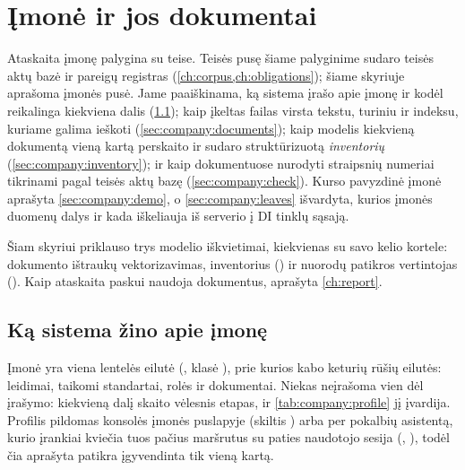 \chapter{Įmonė ir jos dokumentai}\label{ch:company}

Ataskaita įmonę palygina su teise. Teisės pusę šiame palyginime sudaro teisės aktų bazė ir
pareigų registras (\cref{ch:corpus,ch:obligations}); šiame skyriuje aprašoma įmonės pusė. Jame
paaiškinama, ką sistema įrašo apie įmonę ir kodėl reikalinga kiekviena dalis
(\cref{sec:company:profile}); kaip įkeltas failas virsta tekstu, turiniu ir indeksu, kuriame
galima ieškoti (\cref{sec:company:documents}); kaip modelis kiekvieną dokumentą vieną kartą
perskaito ir sudaro struktūrizuotą \emph{inventorių} (\cref{sec:company:inventory}); ir kaip
dokumentuose nurodyti straipsnių numeriai tikrinami pagal teisės aktų bazę
(\cref{sec:company:check}). Kurso pavyzdinė įmonė \demo{} aprašyta \cref{sec:company:demo}, o
\cref{sec:company:leaves} išvardyta, kurios įmonės duomenų dalys ir kada iškeliauja iš serverio
į DI tinklų sąsają.

Šiam skyriui priklauso trys modelio iškvietimai, kiekvienas su savo kelio kortele: dokumento
ištraukų vektorizavimas, inventorius () ir nuorodų patikros
vertintojas (). Kaip ataskaita paskui naudoja dokumentus,
aprašyta \cref{ch:report}.


\section{Ką sistema žino apie įmonę}\label{sec:company:profile}

Įmonė yra viena lentelės  eilutė (, klasė
), prie kurios kabo keturių rūšių eilutės: leidimai, taikomi standartai, rolės ir
dokumentai. Niekas neįrašoma vien dėl įrašymo: kiekvieną dalį skaito vėlesnis etapas, ir
\cref{tab:company:profile} jį įvardija. Profilis pildomas konsolės įmonės puslapyje (skiltis
) arba per pokalbių asistentą, kurio įrankiai kviečia tuos pačius maršrutus su
paties naudotojo sesija (, ), todėl
čia aprašyta patikra įgyvendinta tik vieną kartą.

